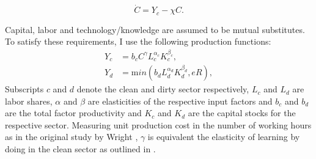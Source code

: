 \begin{equation}
	\dot{C} = Y_c - \chi C.
	\label{eq:learning_by_doing}
\end{equation}

Capital, labor and technology/knowledge are assumed to be mutual substitutes. To satisfy these requirements, I use the following production functions:
\begin{align}
	Y_c &= b_c C^{\gamma} L_c^{\alpha_c}K_c^{\beta_c}, \label{eq:clean_production} \\
	Y_d &= {\mathrm min}\left( b_d L_d^{\alpha_d}K_d^{\beta_d}, e R \right), \label{eq:dirty_production}
\end{align}
Subscripts $c$ and $d$ denote the clean and dirty sector respectively, $L_c$ and $L_d$ are labor shares, $\alpha$ and $\beta$ are elasticities of the respective input factors and $b_c$ and $b_d$ are the total factor productivity and $K_c$ and $K_d$ are the capital stocks for the respective sector. Measuring unit production cost in the number of working hours as in the original study by Wright \cite{wright1936factors}, $\gamma$ is equivalent the elasticity of learning by doing in the clean sector as outlined in \cite{Kahouli-Brahmi2008}.

